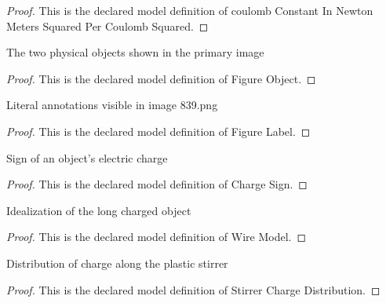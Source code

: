 \begin{proof}
  This is the declared model definition of coulomb Constant In Newton Meters Squared Per Coulomb Squared.
\end{proof}
\begin{definition}
  \label{def:physics:phyx-mini-0839:phyxminiproblems-problemphyxmini0839-figureobject}
  The two physical objects shown in the primary image
\end{definition}
\begin{proof}
  This is the declared model definition of Figure Object.
\end{proof}
\begin{definition}
  \label{def:physics:phyx-mini-0839:phyxminiproblems-problemphyxmini0839-figurelabel}
  Literal annotations visible in image 839.png
\end{definition}
\begin{proof}
  This is the declared model definition of Figure Label.
\end{proof}
\begin{definition}
  \label{def:physics:phyx-mini-0839:phyxminiproblems-problemphyxmini0839-chargesign}
  Sign of an object's electric charge
\end{definition}
\begin{proof}
  This is the declared model definition of Charge Sign.
\end{proof}
\begin{definition}
  \label{def:physics:phyx-mini-0839:phyxminiproblems-problemphyxmini0839-wiremodel}
  Idealization of the long charged object
\end{definition}
\begin{proof}
  This is the declared model definition of Wire Model.
\end{proof}
\begin{definition}
  \label{def:physics:phyx-mini-0839:phyxminiproblems-problemphyxmini0839-stirrerchargedistribution}
  Distribution of charge along the plastic stirrer
\end{definition}
\begin{proof}
  This is the declared model definition of Stirrer Charge Distribution.
\end{proof}
